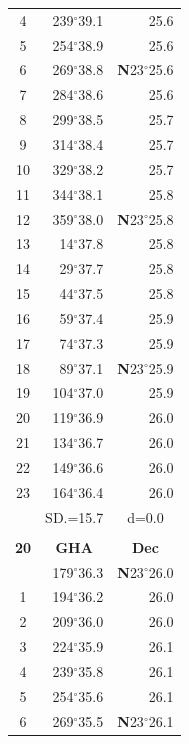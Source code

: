 \documentclass[10pt, a4paper]{report}
\begin{document}
\begin{scriptsize}
\begin{tabular*}{0.2\textwidth}[t]{@{\extracolsep{\fill}}|c|rr|}
4 & 239$^\circ$39.1 & 25.6\\
5 & 254$^\circ$38.9 & 25.6\\[2Pt]
6 & 269$^\circ$38.8 & \textbf{N}23$^\circ$25.6\\
7 & 284$^\circ$38.6 & 25.6\\
8 & 299$^\circ$38.5 & 25.7\\
9 & 314$^\circ$38.4 & \raisebox{0.24ex}{\boldmath$\cdot$~\boldmath$\cdot$~~}25.7\\
10 & 329$^\circ$38.2 & 25.7\\
11 & 344$^\circ$38.1 & 25.8\\[2Pt]
12 & 359$^\circ$38.0 & \textbf{N}23$^\circ$25.8\\
13 & 14$^\circ$37.8 & 25.8\\
14 & 29$^\circ$37.7 & 25.8\\
15 & 44$^\circ$37.5 & \raisebox{0.24ex}{\boldmath$\cdot$~\boldmath$\cdot$~~}25.8\\
16 & 59$^\circ$37.4 & 25.9\\
17 & 74$^\circ$37.3 & 25.9\\[2Pt]
18 & 89$^\circ$37.1 & \textbf{N}23$^\circ$25.9\\
19 & 104$^\circ$37.0 & 25.9\\
20 & 119$^\circ$36.9 & 26.0\\
21 & 134$^\circ$36.7 & \raisebox{0.24ex}{\boldmath$\cdot$~\boldmath$\cdot$~~}26.0\\
22 & 149$^\circ$36.6 & 26.0\\
23 & 164$^\circ$36.4 & 26.0\\
\hline
\rule{0pt}{2.4ex} & \multicolumn{1}{c}{SD.=15.7} & \multicolumn{1}{c|}{d=0.0}\\
\hline
\multicolumn{1}{c}{}\\[-0.5ex]\hline
\multicolumn{1}{|c|}{\rule{0pt}{2.6ex}\textbf{20}} & \multicolumn{1}{c}{\textbf{GHA}} & \multicolumn{1}{c|}{\textbf{Dec}}\\
\hline\rule{0pt}{2.6ex}\noindent
0 & 179$^\circ$36.3 & \textbf{N}23$^\circ$26.0\\
1 & 194$^\circ$36.2 & 26.0\\
2 & 209$^\circ$36.0 & 26.0\\
3 & 224$^\circ$35.9 & \raisebox{0.24ex}{\boldmath$\cdot$~\boldmath$\cdot$~~}26.1\\
4 & 239$^\circ$35.8 & 26.1\\
5 & 254$^\circ$35.6 & 26.1\\[2Pt]
6 & 269$^\circ$35.5 & \textbf{N}23$^\circ$26.1\\

\end{tabular*}
\end{scriptsize}
\end{document}
